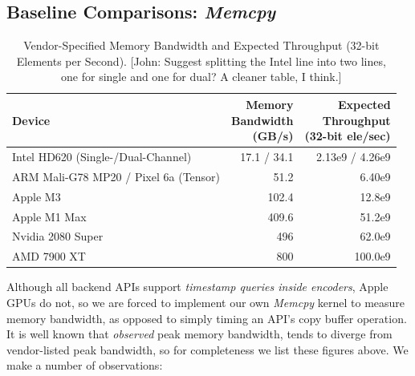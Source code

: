 \documentclass[sigconf]{acmart}
\newcommand{\john}[1]{{\footnotesize\color{cyan}[John: #1]}}
\begin{document}
\subsection{Baseline Comparisons: \emph{Memcpy}}
\label{sec:memcpy}
\begin{table}[h!]
  \small
  \centering
  \begin{tabular}{l r r}
    \toprule
    Device                                & \makecell{Memory                   \\ Bandwidth \\ (GB/s)} & \makecell{Expected \\ Throughput \\ (32-bit ele/sec)} \\
    \midrule
    Intel HD620 (Single-/Dual-Channel)    & 17.1 / 34.1      & 2.13e9 / 4.26e9 \\
    ARM Mali-G78 MP20 / Pixel 6a (Tensor) & 51.2             & 6.40e9          \\
    Apple M3                              & 102.4            & 12.8e9          \\
    Apple M1 Max                          & 409.6            & 51.2e9          \\
    Nvidia 2080 Super                     & 496              & 62.0e9          \\
    AMD 7900 XT                           & 800              & 100.0e9         \\
    \bottomrule
  \end{tabular}
  \caption{Vendor-Specified Memory Bandwidth and Expected Throughput (32-bit Elements per Second). \john{Suggest splitting the Intel line into two lines, one for single and one for dual? A cleaner table, I think.}}
  \label{tab:memory_bandwidth}
\end{table}
Although all backend APIs support \emph{timestamp queries inside encoders}, Apple GPUs do not, so we are forced to implement our own \emph{Memcpy} kernel to measure memory bandwidth, as opposed to simply timing an API's copy buffer operation. It is well known that \emph{observed} peak memory bandwidth, tends to diverge from vendor-listed peak bandwidth, so for completeness we list these figures above. We make a number of observations:
\end{document}
